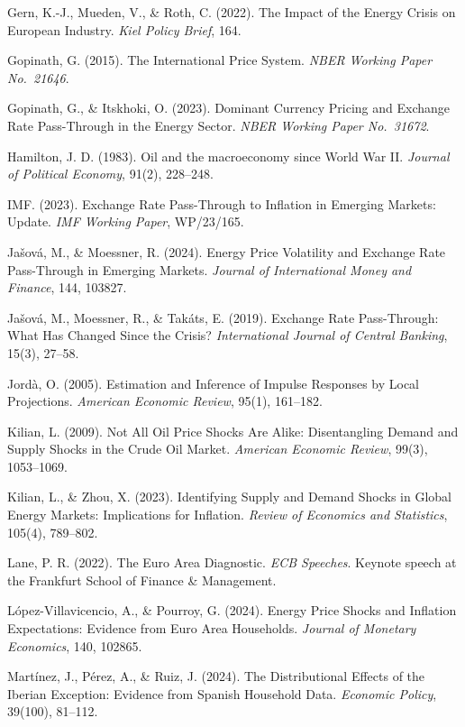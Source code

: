 \documentclass[12pt, a4paper]{article}
\begin{document}
\hangindent=0.5cm Gern, K.-J., Mueden, V., \& Roth, C. (2022). The Impact of the Energy Crisis on European Industry. \textit{Kiel Policy Brief}, 164.

\hangindent=0.5cm Gopinath, G. (2015). The International Price System. \textit{NBER Working Paper No.\ 21646}.

\hangindent=0.5cm Gopinath, G., \& Itskhoki, O. (2023). Dominant Currency Pricing and Exchange Rate Pass-Through in the Energy Sector. \textit{NBER Working Paper No.\ 31672}.

\hangindent=0.5cm Hamilton, J. D. (1983). Oil and the macroeconomy since World War II. \textit{Journal of Political Economy}, 91(2), 228--248.

\hangindent=0.5cm IMF. (2023). Exchange Rate Pass-Through to Inflation in Emerging Markets: Update. \textit{IMF Working Paper}, WP/23/165.

\hangindent=0.5cm Ja\v{s}ov\'{a}, M., \& Moessner, R. (2024). Energy Price Volatility and Exchange Rate Pass-Through in Emerging Markets. \textit{Journal of International Money and Finance}, 144, 103827.

\hangindent=0.5cm Ja\v{s}ov\'{a}, M., Moessner, R., \& Tak\'{a}ts, E. (2019). Exchange Rate Pass-Through: What Has Changed Since the Crisis? \textit{International Journal of Central Banking}, 15(3), 27--58.

\hangindent=0.5cm Jord\`{a}, O. (2005). Estimation and Inference of Impulse Responses by Local Projections. \textit{American Economic Review}, 95(1), 161--182.

\hangindent=0.5cm Kilian, L. (2009). Not All Oil Price Shocks Are Alike: Disentangling Demand and Supply Shocks in the Crude Oil Market. \textit{American Economic Review}, 99(3), 1053--1069.

\hangindent=0.5cm Kilian, L., \& Zhou, X. (2023). Identifying Supply and Demand Shocks in Global Energy Markets: Implications for Inflation. \textit{Review of Economics and Statistics}, 105(4), 789--802.

\hangindent=0.5cm Lane, P. R. (2022). The Euro Area Diagnostic. \textit{ECB Speeches}. Keynote speech at the Frankfurt School of Finance \& Management.

\hangindent=0.5cm L\'{o}pez-Villavicencio, A., \& Pourroy, G. (2024). Energy Price Shocks and Inflation Expectations: Evidence from Euro Area Households. \textit{Journal of Monetary Economics}, 140, 102865.

\hangindent=0.5cm Mart\'{i}nez, J., P\'{e}rez, A., \& Ruiz, J. (2024). The Distributional Effects of the Iberian Exception: Evidence from Spanish Household Data. \textit{Economic Policy}, 39(100), 81--112.
\end{document}
